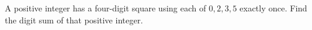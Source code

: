 A positive integer has a four-digit square using each of $0,2,3,5$ exactly once. Find the digit sum of that positive integer.
